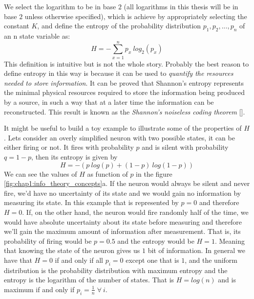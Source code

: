 We select the logarithm to be in base $2$ (all logarithms in this thesis will be in base $2$ unless otherwise specified), which is achieve by appropriately selecting the constant $K$, and define the entropy of the probability distribution $p_1,p_2,...,p_n$ of an n state variable as:
\begin{equation}
\label{eqn:entropy}
    H=- \sum_{x=1}^n p_x\ log_2 (p_x)
\end{equation}
This definition is intuitive but is not the whole story. Probably the best reason to define entropy in this way is because it can be used to \textit{quantify the resources needed to store information}. 
It can be proved that Shannon's entropy represents the minimal physical resources required to store the information being produced by a source, in such a way that at a later time the information can be reconstructed.
This result is known as the \textit{Shannon’s noiseless coding theorem} [\cite{shannon1948}].

It might be useful to build a toy example to illustrate some of the properties of $H$. Lets consider an overly simplified neuron with two possible states, it can be either firing or not. It fires with probability $p$ and is silent with probability $q=1-p$, then its entropy is given by
\begin{equation}
    H=-(p\ log (p) + (1-p)\ log (1-p))
\end{equation}
We can see the values of $H$ as function of $p$ in the figure \ref{fig:chap1:info_theory_concepts}a.
If the neuron would always be silent and never fire, we'd have no uncertainty of its state and we would gain no information by measuring its state.
In this example that is represented by $p=0$ and therefore $H=0$.
If, on the other hand, the neuron would fire randomly half of the time, we would have absolute uncertainty about its state before measuring and therefore we'll gain the maximum amount of information after measurement.
That is, its probability of firing would be $p=0.5$ and the entropy would be $H=1$.
Meaning that knowing the state of the neuron gives us $1$ bit of information.
In general we have that $H=0$ if and only if all $p_i=0$ except one that is $1$, and the uniform distribution is the probability distribution with maximum entropy and the entropy is the logarithm of the number of states.
That is $H=log(n)$ and is maximum if and only if $p_i=\frac{1}{n} \; \forall \ i$.

